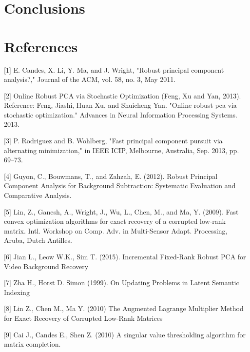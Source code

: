 \documentclass[oneside]{article}
\begin{document}
\section{Conclusions}


\iffalse

\section{References}
[1] \hspace*{8pt} E. Candes, X. Li, Y. Ma, and J. Wright, "Robust principal component analysis?," Journal of the ACM, vol. 58,
no. 3, May 2011.

[2] \hspace*{8pt}Online Robust PCA via Stochastic Optimization	(Feng, Xu and Yan, 2013). Reference: Feng, Jiashi, Huan Xu, and Shuicheng Yan. "Online robust pca via stochastic optimization." Advances in Neural Information Processing Systems. 2013.

[3] \hspace*{8pt}P. Rodriguez and B. Wohlberg, "Fast principal component pursuit via alternating minimization," in IEEE ICIP, Melbourne, Australia, Sep. 2013, pp. 69–73.

[4] \hspace*{8pt}Guyon, C., Bouwmans, T., and Zahzah, E. (2012). Robust Principal Component Analysis for Background Subtraction: Systematic Evaluation and Comparative Analysis.

[5] \hspace*{8pt}Lin, Z., Ganesh, A., Wright, J., Wu, L., Chen, M., and Ma, Y. (2009). Fast convex optimization algorithms for exact recovery of a corrupted low-rank matrix. Intl. Workshop on Comp. Adv. in Multi-Sensor Adapt. Processing, Aruba, Dutch Antilles.

[6] \hspace*{8pt}Jian L.,  Leow W.K., Sim T. (2015). Incremental Fixed-Rank Robust PCA for Video Background Recovery

[7] \hspace*{8pt} Zha H., Horst D. Simon (1999). On Updating Problems in Latent Semantic Indexing

[8] \hspace*{8pt} Lin Z., Chen M., Ma Y. (2010) The Augmented Lagrange Multiplier Method for Exact Recovery of Corrupted Low-Rank Matrices

[9] \hspace*{8pt} Cai J., Candes E., Shen Z. (2010) A singular value thresholding algorithm for matrix completion.
\end{document}
